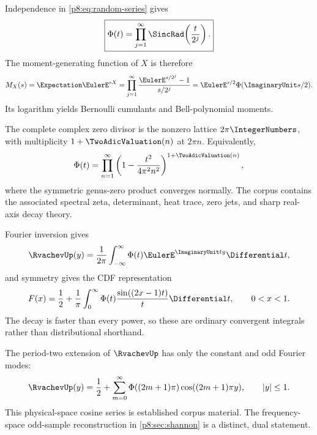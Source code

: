 \documentclass[11pt]{article}
\theoremstyle{definition}
\theoremstyle{remark}
\begin{document}
\baseline Independence in \eqref{p8:eq:random-series} gives
\begin{equation}
 \boxed{\displaystyle
 \Phi(t)=\prod_{j=1}^\infty\SincRad\!\left(\frac{t}{2^j}\right).}
                                                               \label{p8:eq:sinc-product}
\end{equation}
The moment-generating function of $X$ is therefore
\begin{equation}
 M_X(s)=\Expectation\EulerE^{sX}
 =\prod_{j=1}^\infty\frac{\EulerE^{s/2^j}-1}{s/2^j}
 =\EulerE^{s/2}\Phi(\ImaginaryUnit s/2).                                \label{p8:eq:mgf-product}
\end{equation}
Its logarithm yields Bernoulli cumulants and Bell-polynomial moments.

The complete complex zero divisor is the nonzero lattice $2\pi\IntegerNumbers$, with
multiplicity $1+\TwoAdicValuation(n)$ at $2\pi n$.  Equivalently,
\begin{equation}
 \Phi(t)=\prod_{n=1}^\infty
 \left(1-\frac{t^2}{4\pi^2n^2}\right)^{1+\TwoAdicValuation(n)},     \label{p8:eq:canonical-product}
\end{equation}
where the symmetric genus-zero product converges normally.  The corpus
contains the associated spectral zeta, determinant, heat trace, zero jets,
and sharp real-axis decay theory.

Fourier inversion gives
\begin{equation}
 \RvachevUp(y)=\frac1{2\pi}\int_{-\infty}^{\infty}
          \Phi(t)\EulerE^{\ImaginaryUnit ty}\Differential t,                       \label{p8:eq:up-fourier-inversion}
\end{equation}
and symmetry gives the CDF representation
\begin{equation}
 F(x)=\frac12+\frac1\pi\int_0^\infty
       \Phi(t)\frac{\sin((2x-1)t)}{t}\Differential t,
 \qquad 0<x<1.                                           \label{p8:eq:F-sine-integral}
\end{equation}
The decay is faster than every power, so these are ordinary convergent
integrals rather than distributional shorthand.

The period-two extension of $\RvachevUp$ has only the constant and odd Fourier modes:
\begin{equation}
 \RvachevUp(y)=\frac12+\sum_{m=0}^\infty
   \Phi((2m+1)\pi)\cos((2m+1)\pi y),\qquad |y|\le1.      \label{p8:eq:physical-cosine-series}
\end{equation}
This physical-space cosine series is established corpus material.  The
frequency-space odd-sample reconstruction in \cref{p8:sec:shannon} is a distinct,
dual statement.
\end{document}
